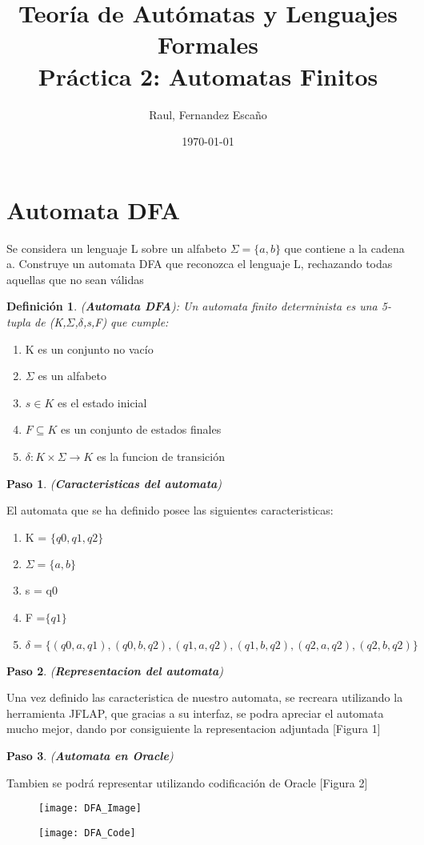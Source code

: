 \documentclass{article}
\title{Teoría de Autómatas y Lenguajes Formales\\[.4\baselineskip]Práctica 2: Automatas Finitos}
\author{Raul, Fernandez Escaño}
\date{\today}
\newtheorem{example}{Paso}
\newtheorem{definicion}{Definición}[section]
\begin{document}

\maketitle

\section{Automata DFA}
Se considera un lenguaje L sobre un alfabeto $\Sigma=\{a,b\}$ que contiene a la cadena a. Construye un automata DFA que reconozca el lenguaje L, rechazando todas aquellas que no sean válidas
\begin{definicion}(\textbf{Automata DFA}): Un automata finito determinista es una 5-tupla de (K,$\Sigma$,$\delta$,s,F) que cumple:
\end{definicion}
	\begin{enumerate}[label=]
		\item K es un conjunto no vacío
		\item $\Sigma$ es un alfabeto
		\item $s\in K$ es el estado inicial
		\item $F \subseteq K$ es un conjunto de estados finales
		\item $\delta \colon K \times \Sigma \rightarrow K$ es la funcion
		de transición
	\end{enumerate}
 \begin{example}(\textbf{Caracteristicas del automata}) \end{example}
 El automata que se ha definido posee las siguientes caracteristicas:
  \begin{enumerate}
  	\item K = $\{q0,q1,q2\}$
  	\item $\Sigma = \{a,b\}$
  	\item s = q0
  	\item F =$ \{q1\}$
  	\item $\delta = \{(q0,a,q1),(q0,b,q2),(q1,a,q2),(q1,b,q2)
  	,(q2,a,q2),(q2,b,q2)\}$
  \end{enumerate}
  \begin{example}(\textbf{Representacion del automata}) \end{example}Una vez definido las caracteristica de nuestro automata, se recreara    utilizando la herramienta JFLAP, que gracias a su interfaz, se podra 	   apreciar el automata mucho mejor, dando por consiguiente la representacion adjuntada [Figura 1]
\begin{example}(\textbf{Automata en Oracle}) \end{example}Tambien se podrá representar utilizando codificación de Oracle [Figura 2]


\begin{figure}
 	\texttt{[image: DFA\_Image]}
 	\caption{}
\end{figure}
\begin{figure}
	\texttt{[image: DFA\_Code]}
	\caption{}
\end{figure}
\end{document}
